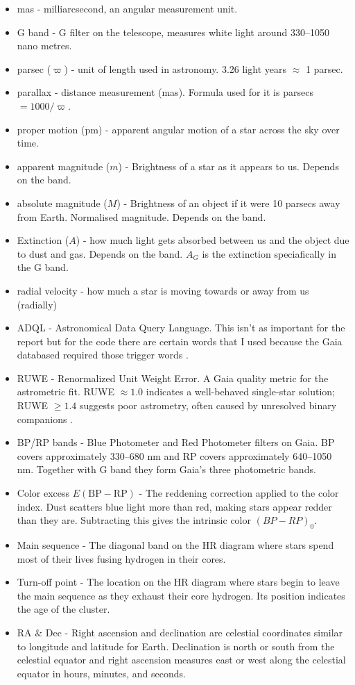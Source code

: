 \documentclass[12pt]{article}
\begin{document}
\begin{itemize}
    \item mas - milliarcsecond, an angular measurement unit.
    \item G band - G filter on the telescope, measures white light around 330--1050 nano metres.
    \item parsec ($\varpi$) - unit of length used in astronomy. 3.26 light years $\approx$ 1 parsec.
    \item parallax - distance measurement (mas). Formula used for it is parsecs $=1000/\varpi$.
    \item proper motion (pm) - apparent angular motion of a star across the sky over time.
    \item apparent magnitude ($m$) - Brightness of a star as it appears to us. Depends on the band.
    \item absolute magnitude ($M$) - Brightness of an object if it were 10 parsecs away from Earth. Normalised magnitude. Depends on the band.
    \item Extinction ($A$) - how much light gets absorbed between us and the object due to dust and gas. Depends on the band. $A_G$ is the extinction speciafically in the G band.
    \item radial velocity - how much a star is moving towards or away from us (radially)
    \item ADQL - Astronomical Data Query Language. This isn't as important for the report but for the code there are certain words that I used because the Gaia databased required those trigger words \cite{adql}.
    \item RUWE - Renormalized Unit Weight Error. A Gaia quality metric for the astrometric fit. RUWE $\approx 1.0$ indicates a well-behaved single-star solution; RUWE $\geq 1.4$ suggests poor astrometry, often caused by unresolved binary companions \citep{pearce2022ruwe}.
    \item BP/RP bands - Blue Photometer and Red Photometer filters on Gaia. BP covers approximately 330--680 nm and RP covers approximately 640--1050 nm. Together with G band they form Gaia's three photometric bands.
    \item Color excess $E(\text{BP}-\text{RP})$ - The reddening correction applied to the color index. Dust scatters blue light more than red, making stars appear redder than they are. Subtracting this gives the intrinsic color $(BP-RP)_0$.
    \item Main sequence - The diagonal band on the HR diagram where stars spend most of their lives fusing hydrogen in their cores.
    \item Turn-off point - The location on the HR diagram where stars begin to leave the main sequence as they exhaust their core hydrogen. Its position indicates the age of the cluster.
    \item RA $\&$ Dec - Right ascension and declination are celestial coordinates similar to longitude and latitude for Earth. Declination is north or south from the celestial equator and right ascension measures east or west along the celestial equator in hours, minutes, and seconds.

\end{itemize}
\end{document}
